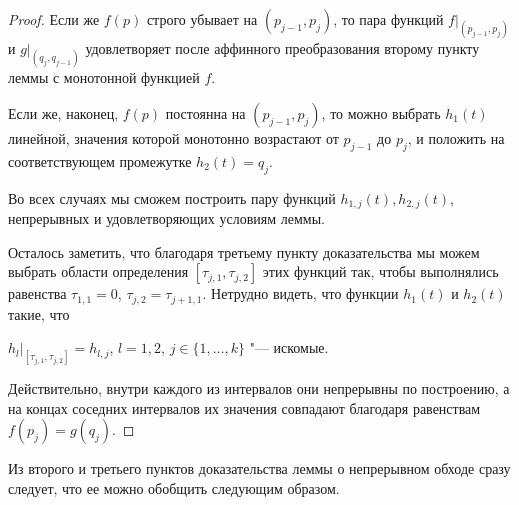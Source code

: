 \begin{proof}
Если же $f(p)$ строго убывает на $(p_{j-1},p_j)$, то пара функций $f|_{(p_{j-1},p_j)}$ и $g|_{(q_j,q_{j-1})}$ удовлетворяет после аффинного преобразования второму пункту леммы с монотонной функцией $f$. 

Если же, наконец, $f(p)$ постоянна на $(p_{j-1},p_j)$, то можно выбрать $h_1(t)$ линейной, значения которой монотонно возрастают от $p_{j-1}$ до $p_j$, и положить на соответствующем промежутке $h_2(t)=q_j$. 

Во всех случаях мы сможем построить пару функций $h_{1,j}(t),h_{2,j}(t)$, непрерывных и удовлетворяющих условиям леммы. 



Осталось заметить, что благодаря третьему пункту доказательства мы можем выбрать области определения $[\tau_{j,1},\tau_{j,2}]$ этих функций так, чтобы выполнялись равенства $\tau_{1,1}=0$, $\tau_{j,2}=\tau_{j+1,1}$. Нетрудно видеть, что функции $h_1(t)$ и $h_2(t)$ такие, что

$h_l|_{[\tau_{j,1},\tau_{j,2}]}=h_{l,j}$, $l=1,2$, $j\in\{1,\dots,k\}$ "--- искомые. 



Действительно, внутри каждого из интервалов они непрерывны по построению, а на концах соседних интервалов их значения совпадают благодаря равенствам $f(p_j)=g(q_j)$. \hfill

\end{proof}



\smallskip



Из второго и третьего пунктов доказательства леммы о непрерывном обходе сразу следует, что ее можно обобщить следующим образом.



\smallskip



\hypertarget{palin:lemma2}{}



